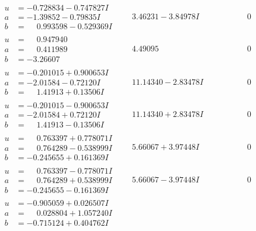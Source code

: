 \documentclass[1p]{elsarticle_modified}
\theoremstyle{definition}
\begin{document}
$$\begin{array}{c|c|c}
\begin{aligned}
u &= -0.728834 - 0.747827 I \\
a &= -1.39852 - 0.79835 I \\
b &= \phantom{-}0.993598 - 0.529369 I\end{aligned}
 & \phantom{-}3.46231 - 3.84978 I & \phantom{-0.000000 } 0 \\ \hline\begin{aligned}
u &= \phantom{-}0.947940\phantom{ +0.000000I} \\
a &= \phantom{-}0.411989\phantom{ +0.000000I} \\
b &= -3.26607\phantom{ +0.000000I}\end{aligned}
 & \phantom{-}4.49095\phantom{ +0.000000I} & \phantom{-0.000000 } 0 \\ \hline\begin{aligned}
u &= -0.201015 + 0.900653 I \\
a &= -2.01584 - 0.72120 I \\
b &= \phantom{-}1.41913 + 0.13506 I\end{aligned}
 & \phantom{-}11.14340 - 2.83478 I & \phantom{-0.000000 } 0 \\ \hline\begin{aligned}
u &= -0.201015 - 0.900653 I \\
a &= -2.01584 + 0.72120 I \\
b &= \phantom{-}1.41913 - 0.13506 I\end{aligned}
 & \phantom{-}11.14340 + 2.83478 I & \phantom{-0.000000 } 0 \\ \hline\begin{aligned}
u &= \phantom{-}0.763397 + 0.778071 I \\
a &= \phantom{-}0.764289 - 0.538999 I \\
b &= -0.245655 + 0.161369 I\end{aligned}
 & \phantom{-}5.66067 + 3.97448 I & \phantom{-0.000000 } 0 \\ \hline\begin{aligned}
u &= \phantom{-}0.763397 - 0.778071 I \\
a &= \phantom{-}0.764289 + 0.538999 I \\
b &= -0.245655 - 0.161369 I\end{aligned}
 & \phantom{-}5.66067 - 3.97448 I & \phantom{-0.000000 } 0 \\ \hline\begin{aligned}
u &= -0.905059 + 0.026507 I \\
a &= \phantom{-}0.028804 + 1.057240 I \\
b &= -0.715124 + 0.404762 I\end{aligned}

\end{array}$$
\end{document}
